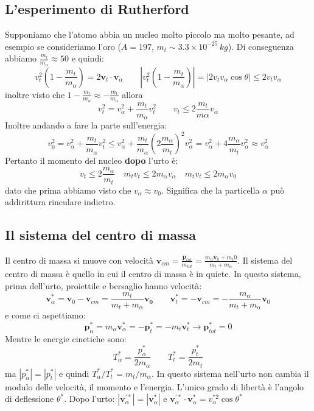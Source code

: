 \subsection{L'esperimento di Rutherford}
Supponiamo che l'atomo abbia un nucleo molto piccolo ma molto pesante, ad esempio se consideriamo l'oro ($A=197$, $m_t\sim3.3\times10^{-25}\,kg$). Di conseguenza abbiamo $\frac{m_t}{m_\alpha}\approx50$ e quindi:
\begin{equation*}
    v_t^2\left(1-\frac{m_t}{m_\alpha}\right)=2\mathbf{v}_t\cdot\mathbf{v}_\alpha \qquad \left|v_t^2\left(1-\frac{m_t}{m_\alpha}\right)\right|=|2v_tv_\alpha\cos{\theta}|\le 2v_tv_\alpha
\end{equation*}
inoltre visto che $1-\frac{m_t}{m_\alpha}\approx-\frac{m_t}{m_\alpha}$ allora
\begin{equation*}
    v_t^2=v_\alpha^2+\frac{m_t}{m_\alpha}v_t^2 \qquad v_t\le2\frac{m_t}{m\alpha}v_\alpha
\end{equation*}
Inoltre andando a fare la parte sull'energia:
\begin{equation*}
    v_0^2=v_\alpha^2+\frac{m_t}{m_\alpha}v_t^2 \le v_\alpha^2+\frac{m_t}{m_\alpha}\left(2\frac{m_\alpha}{m_t}\right)^2v_\alpha^2=v_\alpha^2+4\frac{m_\alpha}{m_t}v_\alpha^2 \approx v_\alpha^2
\end{equation*}
Pertanto il momento del nucleo \textbf{dopo} l'urto è:
\begin{equation*}
    v_t\le2\frac{m_\alpha}{m_t} \quad m_tv_t\le 2m_\alpha v_\alpha \quad m_tv_t\le2m_\alpha v_0
\end{equation*}
dato che prima abbiamo visto che $v_\alpha\approx v_0$. Significa che la particella $\alpha$ può addirittura rinculare indietro.
\subsection{Il sistema del centro di massa}
Il centro di massa si muove con velocità $\mathbf{v}_{cm}=\frac{\mathbf{p}_{tot}}{m_{tot}}=\frac{m_\alpha\mathbf{v}_0+m_t 0}{m_t+m_\alpha}$. Il sistema del centro di massa è quello in cui il centro di massa è in quiete. In questo sistema, prima dell'urto, proiettile e bersaglio hanno velocità:
\begin{equation*}
    \mathbf{v}_\alpha^{*}=\mathbf{v}_0-\mathbf{v}_{cm}=\frac{m_t}{m_t+m_\alpha}\mathbf{v_0}\qquad \mathbf{v}_t^{*}=-\mathbf{v}_{cm}=-\frac{m_\alpha}{m_t+m_\alpha}\mathbf{v}_0
\end{equation*}
e come ci aspettiamo:
\begin{equation*}
    \mathbf{p}_\alpha^{*}=m_\alpha\mathbf{v}_\alpha^{*}=-\mathbf{p}_t^{*}=-m_t\mathbf{v}_t^{*}\to\mathbf{p}_{tot}^{*}=0
\end{equation*}
Mentre le energie cinetiche sono:
\begin{equation*}
    T_\alpha^{*}=\frac{p_\alpha^{*}}{2m_\alpha} \qquad T_t^{*}=\frac{p_t^{*}}{2m_t}
\end{equation*}
ma $|p_\alpha^{*}|=|p_t^{*}|$ e quindi $T_\alpha^{*}/T_t^{*}=m_t/m_\alpha$. In questo sistema nell'urto non cambia il modulo delle velocità, il momento e l'energia. L'unico grado di libertà è l'angolo di deflessione $\theta^{*}$. Dopo l'urto: $|\mathbf{v}_\alpha^{'*}|=|\mathbf{v}_\alpha^{*}|$ e $\mathbf{v}_\alpha^{'*}\cdot\mathbf{v}_\alpha^{*}=v_\alpha^{*2}\cos{\theta^{*}}$